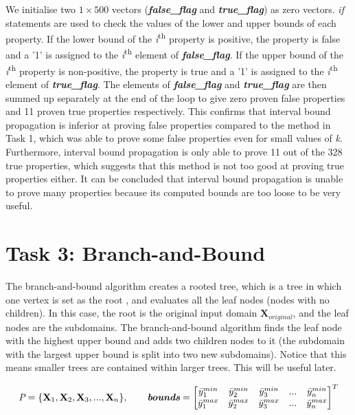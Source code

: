 \documentclass[11pt]{article}
\begin{document}
We initialise two $1\times500$ vectors (\emph{\textbf{false\_flag}} and \emph{\textbf{true\_flag}}) as zero vectors. \emph{if} statements are used to check the values of the lower and upper bounds of each property. If the lower bound of the \emph{i}\textsuperscript{th} property is positive, the property is false and a '1' is assigned to the \emph{i}\textsuperscript{th} element of \emph{\textbf{false\_flag}}. If the upper bound of the \emph{i}\textsuperscript{th} property is non-positive, the property is true and a '1' is assigned to the \emph{i}\textsuperscript{th} element of \emph{\textbf{true\_flag}}. The elements of \emph{\textbf{false\_flag}} and \emph{\textbf{true\_flag}} are then summed up separately at the end of the loop to give zero proven false properties and 11 proven true properties respectively. This confirms that interval bound propagation is inferior at proving false properties compared to the method in Task 1, which was able to prove some false properties even for small values of \emph{k}. Furthermore, interval bound propagation is only able to prove 11 out of the 328 true properties, which suggests that this method is not too good at proving true properties either. It can be concluded that interval bound propagation is unable to prove many properties because its computed bounds are too loose to be very useful.

\section{Task 3: Branch-and-Bound}
\label{sec:Task 3}

The branch-and-bound algorithm creates a rooted tree, which is a tree in which one vertex is set as the root \cite{Trees}, and evaluates all the leaf nodes (nodes with no children). In this case, the root is the original input domain ${\textbf{X}_{original}}$, and the leaf nodes are the subdomains. The branch-and-bound algorithm finds the leaf node with the highest upper bound and adds two children nodes to it (the subdomain with the largest upper bound is split into two new subdomains). Notice that this means smaller trees are contained within larger trees. This will be useful later.


\[
\emph{P} = \{{\textbf{X}_1},{\textbf{X}_2},{\textbf{X}_3},...,{\textbf{X}_n}\}, \qquad  \emph{\textbf{bounds}} = \begin{bmatrix}
{\Bar{y}_1}^{min} & {\Bar{y}_2}^{min} & {\Bar{y}_3}^{min} & ... & {\Bar{y}_n}^{min}
\\
{\Bar{y}_1}^{max} & {\Bar{y}_2}^{max} & {\Bar{y}_3}^{max} & ... & {\Bar{y}_n}^{max}\\
\end{bmatrix}^T
\]
\end{document}
